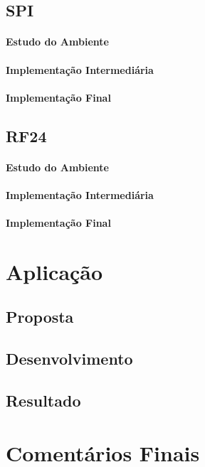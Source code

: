 \documentclass{article}
\begin{document}
\subsection{SPI}

\paragraph{Estudo do Ambiente}
\paragraph{Implementação Intermediária}
\paragraph{Implementação Final}

\subsection{RF24}

\paragraph{Estudo do Ambiente}
\paragraph{Implementação Intermediária}
\paragraph{Implementação Final}

\section{Aplicação}

\subsection{Proposta}
\subsection{Desenvolvimento}
\subsection{Resultado}

\section{Comentários Finais}

\newpage

\printbibliography
\end{document}
